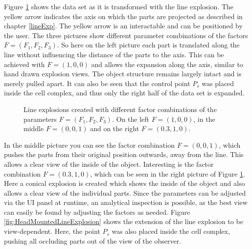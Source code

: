 Figure \ref{fig:LineExplosionPictures} shows the data set as it is transformed with the line explosion. The yellow arrow indicates the axis on which the parts are projected as described in chapter \ref{lineExp}. 
The yellow arrow is an interactable and can be positioned by the user. 
The three pictures show different parameter combinations of the factors $F=(F_1, F_2, F_3)$. So here on the left picture each part is translated along the line without influencing the distance of the parts to the axis.  
This can be achieved with $F=(1,0,0)$ and allows the expansion along the axis, similar to hand drawn explosion views. The object structure remains largely intact and is merely pulled apart. It can also be seen that the control point $P_s$ was placed inside the cell complex, and thus only the right half of the data set is expanded. 
\begin{figure}[t]
	\noindent{}
	\caption[]{Line explosions created with different factor combinations of the parameters $F=(F_1, F_2, F_3)$. On the left $F=(1,0,0)$, in the middle $F=(0, 0, 1)$ and on the right $F=(0.3, 1, 0)$.}
	\label{fig:LineExplosionPictures}
\end{figure}
In the middle picture you can see the factor combination $F=(0, 0, 1)$, which pushes the parts from their original position outwards, away from the line. 
This allows a clear view of the inside of the object. 
Interesting is the factor combination $F=(0.3, 1, 0)$, which can be seen in the right picture of Figure \ref{fig:LineExplosionPictures}. Here a conical explosion is created which shows the inside of the object and also allows a clear view of the individual parts.  
Since the parameters can be adjusted via the UI panel at runtime, an analytical inspection is possible, as the best view can easily be found by adjusting the factors as needed.   
Figure \ref{fig:HeadMountedLineExplosion} shows the extension of the line explosion to be view-dependent. Here, the point $P_s$ was also placed inside the cell complex, pushing all occluding parts out of the view of the observer. 
